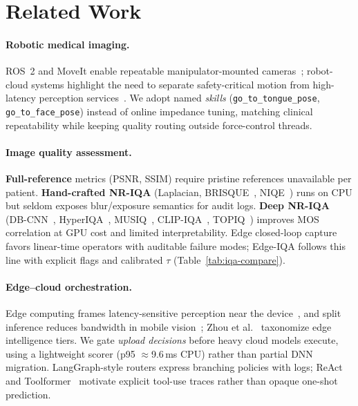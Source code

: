 \section{Related Work}
\label{sec:related}

\paragraph{Robotic medical imaging.}
ROS~2 and MoveIt enable repeatable manipulator-mounted cameras~\cite{moore2021ros2,chitta2009moveit}; robot-cloud systems highlight the need to separate safety-critical motion from high-latency perception services~\cite{liu2019robotcloud}.
We adopt named \emph{skills} (\texttt{go\_to\_tongue\_pose}, \texttt{go\_to\_face\_pose}) instead of online impedance tuning, matching clinical repeatability while keeping quality routing outside force-control threads.

\paragraph{Image quality assessment.}
\textbf{Full-reference} metrics (PSNR, SSIM) require pristine references unavailable per patient.
\textbf{Hand-crafted NR-IQA} (Laplacian, BRISQUE~\cite{mittal2012brisque}, NIQE~\cite{mittal2012niqe}) runs on CPU but seldom exposes blur/exposure semantics for audit logs.
\textbf{Deep NR-IQA} (DB-CNN~\cite{zhang2018blind}, HyperIQA~\cite{su2020hyperiqa}, MUSIQ~\cite{ke2021musiq}, CLIP-IQA~\cite{wang2023clipiqa}, TOPIQ~\cite{chen2024topiq}) improves MOS correlation at GPU cost and limited interpretability.
Edge closed-loop capture favors linear-time operators with auditable failure modes; Edge-IQA follows this line with explicit flags and calibrated $\tau$ (Table~\ref{tab:iqa-compare}).

\paragraph{Edge--cloud orchestration.}
Edge computing frames latency-sensitive perception near the device~\cite{wang2014edge}, and split inference reduces bandwidth in mobile vision~\cite{kang2017neurosurgeon,li2018edge,zhou2019edge}; Zhou et al.~\cite{zhou2019edge} taxonomize edge intelligence tiers.
We gate \emph{upload decisions} before heavy cloud models execute, using a lightweight scorer (p95 $\approx$9.6\,ms CPU) rather than partial DNN migration.
LangGraph-style routers express branching policies with logs; ReAct~\cite{yao2023react} and Toolformer~\cite{schick2023toolformer} motivate explicit tool-use traces rather than opaque one-shot prediction.

